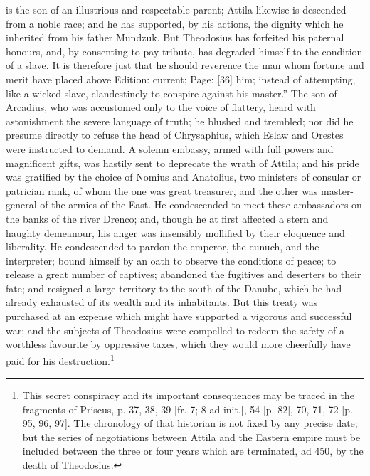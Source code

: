 is the son of an illustrious and respectable parent; Attila likewise is descended from a noble race; and he has supported, by his actions, the dignity which he inherited from his father Mundzuk. But Theodosius has forfeited his paternal honours, and, by consenting to pay tribute, has degraded himself to the condition of a slave. It is therefore just that he should reverence the man whom fortune and merit have placed above Edition: current; Page: [36] him; instead of attempting, like a wicked slave, clandestinely to conspire against his master.\texthebrew{}” The son of Arcadius, who was accustomed only to the voice of flattery, heard with astonishment the severe language of truth; he blushed and trembled; nor did he presume directly to refuse the head of Chrysaphius, which Eslaw and Orestes were instructed to demand. A solemn embassy, armed with full powers and magnificent gifts, was hastily sent to deprecate the wrath of Attila; and his pride was gratified by the choice of Nomius and Anatolius, two ministers of consular or patrician rank, of whom the one was great treasurer, and the other was master-general of the armies of the East. He condescended to meet these ambassadors on the banks of the river Drenco; and, though he at first affected a stern and haughty demeanour, his anger was insensibly mollified by their eloquence and liberality. He condescended to pardon the emperor, the eunuch, and the interpreter; bound himself by an oath to observe the conditions of peace; to release a great number of captives; abandoned the fugitives and deserters to their fate; and resigned a large territory to the south of the Danube, which he had already exhausted of its wealth and its inhabitants. But this treaty was purchased at an expense which might have supported a vigorous and successful war; and the subjects of Theodosius were compelled to redeem the safety of a worthless favourite by oppressive taxes, which they would more cheerfully have paid for his destruction.\footnote{This secret conspiracy and its important consequences may be traced in the fragments of Priscus, p. 37, 38, 39 [fr. 7; 8 ad init.], 54 [p. 82], 70, 71, 72 [p. 95, 96, 97]. The chronology of that historian is not fixed by any precise date; but the series of negotiations between Attila and the Eastern empire must be included between the three or four years which are terminated, ad 450, by the death of Theodosius.}

